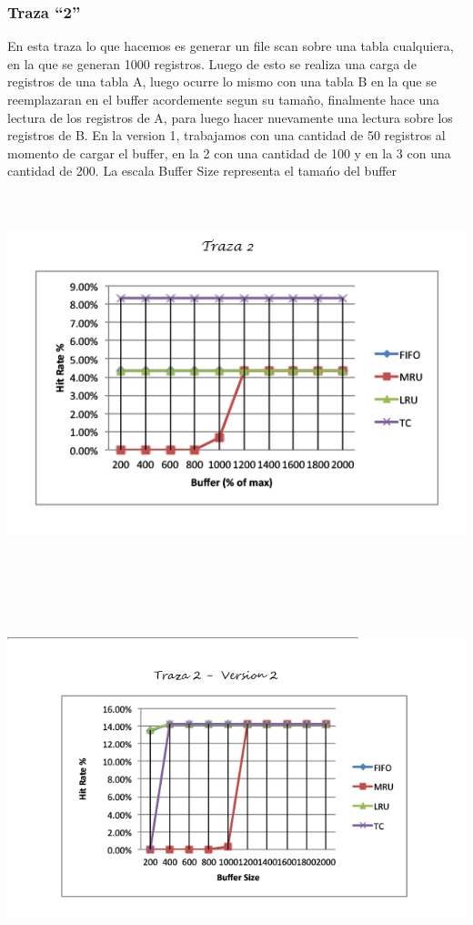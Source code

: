 \subsubsection*{Traza ``2''}
En esta traza lo que hacemos es generar un file scan sobre una tabla cualquiera, en la que se generan 1000 registros. Luego de esto se realiza una carga de registros de una tabla A, luego ocurre lo mismo con una tabla B en la que se reemplazaran en el buffer acordemente segun su tama\~no, finalmente hace una lectura de los registros de A, para luego hacer nuevamente una lectura sobre los registros de B. En la version 1, trabajamos con una cantidad de 50 registros al momento de cargar el buffer, en la 2 con una cantidad de 100 y en la 3 con una cantidad de 200. La escala Buffer Size representa el tama\'no del buffer
\begin{center}
  \includegraphics[height=11cm]{img/T2.png}
\end{center}  
\begin{center}
  \includegraphics[height=11cm]{img/T2V2.png}
\end{center}  
